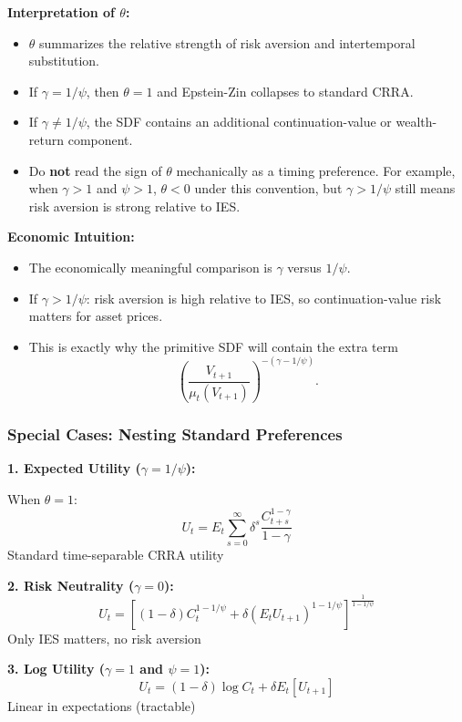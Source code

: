 \documentclass{beamer}
\begin{document}
\begin{frame}[allowframebreaks]
    \framebreak
    
    \textbf{Interpretation of $\theta$:}
    \begin{itemize}
        \item $\theta$ summarizes the relative strength of risk aversion and intertemporal substitution.
        \item If $\gamma = 1/\psi$, then $\theta=1$ and Epstein-Zin collapses to standard CRRA.
        \item If $\gamma \neq 1/\psi$, the SDF contains an additional continuation-value or wealth-return component.
        \item Do \textbf{not} read the sign of $\theta$ mechanically as a timing preference. For example, when $\gamma>1$ and $\psi>1$, $\theta<0$ under this convention, but $\gamma>1/\psi$ still means risk aversion is strong relative to IES.
    \end{itemize}
    
    
    \textbf{Economic Intuition:}
    \begin{itemize}
        \item The economically meaningful comparison is $\gamma$ versus $1/\psi$.
        \item If $\gamma > 1/\psi$: risk aversion is high relative to IES, so continuation-value risk matters for asset prices.
        \item This is exactly why the primitive SDF will contain the extra term
        \[
            \left(\frac{V_{t+1}}{\mu_t(V_{t+1})}\right)^{-(\gamma-1/\psi)}.
        \]
    \end{itemize}
    
\end{frame}

\begin{frame}
    \frametitle{Special Cases: Nesting Standard Preferences}
    
    \textbf{1. Expected Utility ($\gamma = 1/\psi$):}
    
    When $\theta = 1$:
    \begin{equation*}
        U_t = E_t \sum_{s=0}^{\infty} \delta^s \frac{C_{t+s}^{1-\gamma}}{1-\gamma}
    \end{equation*}
    Standard time-separable CRRA utility
    
    
    \textbf{2. Risk Neutrality ($\gamma = 0$):}
    \begin{equation*}
        U_t = \left[ (1-\delta)C_t^{1-1/\psi} + \delta (E_t U_{t+1})^{1-1/\psi} \right]^{\frac{1}{1-1/\psi}}
    \end{equation*}
    Only IES matters, no risk aversion
    
    
    \textbf{3. Log Utility ($\gamma = 1$ and $\psi = 1$):}
    \begin{equation*}
        U_t = (1-\delta) \log C_t + \delta E_t[U_{t+1}]
    \end{equation*}
    Linear in expectations (tractable)
    
\end{frame}
\end{document}
